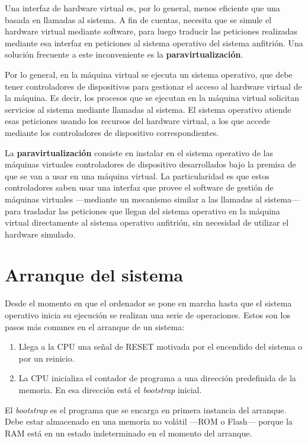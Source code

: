 Una interfaz de hardware virtual es, por lo general, menos eficiente que
una basada en llamadas al sistema. A fin de cuentas, necesita que se
simule el hardware virtual mediante software, para luego traducir las
peticiones realizadas mediante esa interfaz en peticiones al sistema
operativo del sistema anfitrión. Una solución frecuente a este
inconveniente es la \textbf{paravirtualización}.

Por lo general, en la máquina virtual se ejecuta un sistema operativo,
que debe tener controladores de dispositivos para gestionar el acceso al
hardware virtual de la máquina. Es decir, los procesos que se ejecutan
en la máquina virtual solicitan servicios al sistema mediante llamadas
al sistema. El sistema operativo atiende esas peticiones usando los
recursos del hardware virtual, a los que accede mediante los
controladores de dispositivo correspondientes.

La \textbf{{}paravirtualización} consiste en instalar en el sistema
operativo de las máquinas virtuales controladores de dispositivo
desarrollados bajo la premisa de que se van a usar en una máquina
virtual. La particularidad es que estos controladores saben usar una
interfaz que provee el software de gestión de máquinas virtuales
---mediante un mecanismo similar a las llamadas al sistema--- para
trasladar las peticiones que llegan del sistema operativo en la máquina
virtual directamente al sistema operativo anfitrión, sin necesidad de
utilizar el hardware simulado.

\section{Arranque del sistema}\label{_arranque_del_sistema}

Desde el momento en que el ordenador se pone en marcha hasta que el
sistema operativo inicia su ejecución se realizan una serie de
operaciones. Estos son los pasos más comunes en el arranque de un
sistema:

\begin{enumerate}
\def\labelenumi{\arabic{enumi}.}
\item
  Llega a la CPU una señal de RESET motivada por el encendido del
  sistema o por un reinicio.
\item
  La CPU inicializa el contador de programa a una dirección predefinida
  de la memoria. En esa dirección está el \emph{bootstrap} inicial.
\end{enumerate}

El \emph{{}bootstrap} es el programa que se encarga en primera instancia
del arranque. Debe estar almacenado en una memoria no volátil ---ROM o
Flash--- porque la RAM está en un estado indeterminado en el momento del
arranque.

